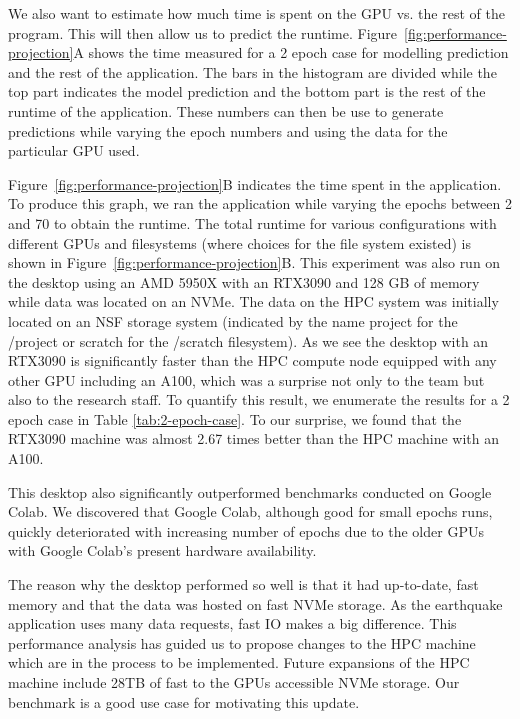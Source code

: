 \documentclass[utf8]{FrontiersinVancouver} %
\begin{document}
We also want to estimate how much time is spent on the GPU vs. the rest
of the program. This will then allow us to predict the runtime.
Figure~\ref{fig:performance-projection}A shows the time measured for a
2 epoch case for modelling prediction and the rest of the
application. The bars in the histogram are divided while the top part
indicates the model prediction and the bottom part is the rest of the
runtime of the application. These numbers can then be use to generate
predictions while varying the epoch numbers and using the data for the
particular GPU used.

Figure~\ref{fig:performance-projection}B indicates the time spent in
the application.  To produce this graph, we ran the application while
varying the epochs between 2 and 70 to obtain the runtime.  The total
runtime for various configurations with different GPUs and filesystems
(where choices for the file system existed) is shown in
Figure~\ref{fig:performance-projection}B.  This experiment was also
run on the desktop using an AMD 5950X with an RTX3090 and 128 GB of
memory while data was located on an NVMe. The data on the HPC system
was initially located on an NSF storage system (indicated by the name
project for the /project or scratch for the /scratch filesystem).  As
we see the desktop with an RTX3090 is significantly faster than the
HPC compute node equipped with any other GPU including an A100, which
was a surprise not only to the team but also to the research staff. To
quantify this result, we enumerate the results for a 2 epoch case in
Table \ref{tab:2-epoch-case}.  To our surprise, we found that the
RTX3090 machine was almost 2.67 times better than the HPC machine with
an A100.

This desktop also significantly outperformed benchmarks conducted on
Google Colab. We discovered that Google Colab, although good for small
epochs runs, quickly deteriorated with increasing number of epochs due
to the older GPUs with Google Colab's present hardware availability.

The reason why the desktop performed so well is that it had
up-to-date, fast memory and that the data was hosted on fast NVMe
storage. As the earthquake application uses many data requests, fast
IO makes a big difference. This performance analysis has guided us to
propose changes to the HPC machine which are in the process to be
implemented. Future expansions of the HPC machine include 28TB of fast
to the GPUs accessible NVMe storage. Our benchmark is a good use case
for motivating this update.
\end{document}
